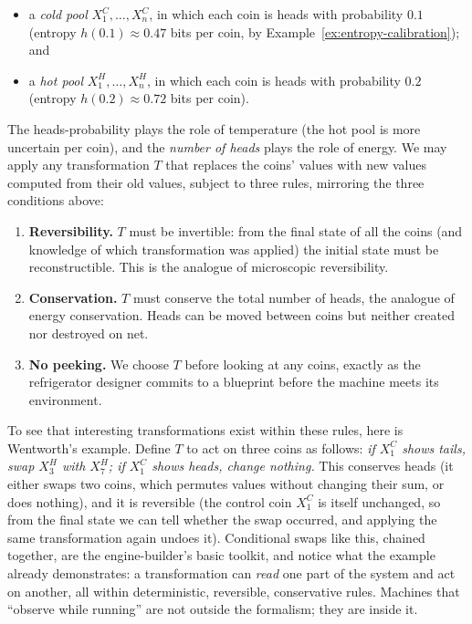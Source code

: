 \documentclass[10pt]{article}
\theoremstyle{definition}
\theoremstyle{remark}
\begin{document}
\begin{itemize}[leftmargin=2em]
  \item a \emph{cold pool} $X^C_1, \dots, X^C_n$, in which each coin is heads with probability $0.1$ (entropy $h(0.1) \approx 0.47$ bits per coin, by Example~\ref{ex:entropy-calibration}); and
  \item a \emph{hot pool} $X^H_1, \dots, X^H_n$, in which each coin is heads with probability $0.2$ (entropy $h(0.2) \approx 0.72$ bits per coin).
\end{itemize}

The heads-probability plays the role of temperature (the hot pool is more uncertain per coin), and the \emph{number of heads} plays the role of energy. We may apply any transformation $T$ that replaces the coins' values with new values computed from their old values, subject to three rules, mirroring the three conditions above:

\begin{enumerate}[leftmargin=2em]
  \item \textbf{Reversibility.} $T$ must be invertible: from the final state of all the coins (and knowledge of which transformation was applied) the initial state must be reconstructible. This is the analogue of microscopic reversibility.
  \item \textbf{Conservation.} $T$ must conserve the total number of heads, the analogue of energy conservation. Heads can be moved between coins but neither created nor destroyed on net.
  \item \textbf{No peeking.} We choose $T$ before looking at any coins, exactly as the refrigerator designer commits to a blueprint before the machine meets its environment.
\end{enumerate}

To see that interesting transformations exist within these rules, here is Wentworth's example. Define $T$ to act on three coins as follows: \emph{if $X^C_1$ shows tails, swap $X^H_3$ with $X^H_7$; if $X^C_1$ shows heads, change nothing.} This conserves heads (it either swaps two coins, which permutes values without changing their sum, or does nothing), and it is reversible (the control coin $X^C_1$ is itself unchanged, so from the final state we can tell whether the swap occurred, and applying the same transformation again undoes it). Conditional swaps like this, chained together, are the engine-builder's basic toolkit, and notice what the example already demonstrates: a transformation can \emph{read} one part of the system and act on another, all within deterministic, reversible, conservative rules. Machines that ``observe while running'' are not outside the formalism; they are inside it.
\end{document}
